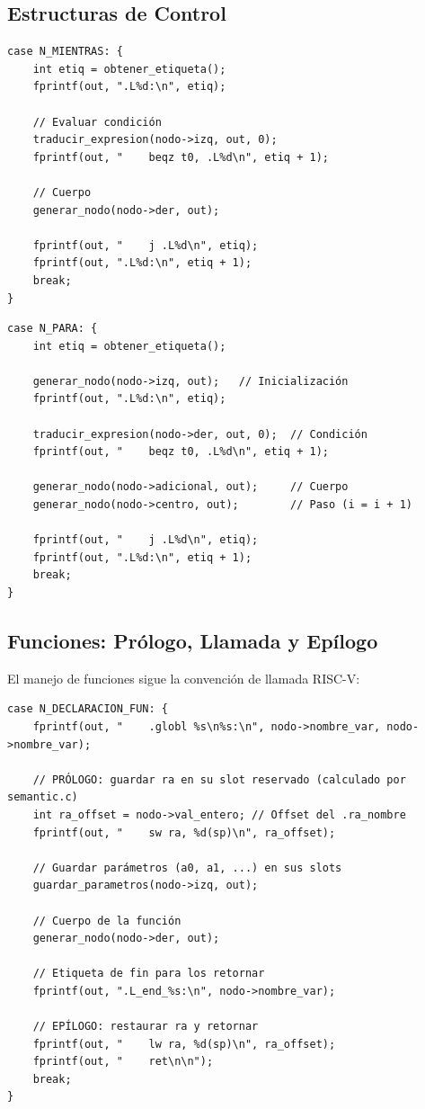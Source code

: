 \subsection{Estructuras de Control}

\begin{lstlisting}[style=cstyle, caption={Generación del bucle mientras}]
case N_MIENTRAS: {
    int etiq = obtener_etiqueta();
    fprintf(out, ".L%d:\n", etiq);
    
    // Evaluar condición
    traducir_expresion(nodo->izq, out, 0);
    fprintf(out, "    beqz t0, .L%d\n", etiq + 1);
    
    // Cuerpo
    generar_nodo(nodo->der, out);
    
    fprintf(out, "    j .L%d\n", etiq);
    fprintf(out, ".L%d:\n", etiq + 1);
    break;
}
\end{lstlisting}

\begin{lstlisting}[style=cstyle, caption={Generación del bucle para}]
case N_PARA: {
    int etiq = obtener_etiqueta();
    
    generar_nodo(nodo->izq, out);   // Inicialización
    fprintf(out, ".L%d:\n", etiq);
    
    traducir_expresion(nodo->der, out, 0);  // Condición
    fprintf(out, "    beqz t0, .L%d\n", etiq + 1);
    
    generar_nodo(nodo->adicional, out);     // Cuerpo
    generar_nodo(nodo->centro, out);        // Paso (i = i + 1)
    
    fprintf(out, "    j .L%d\n", etiq);
    fprintf(out, ".L%d:\n", etiq + 1);
    break;
}
\end{lstlisting}

\subsection{Funciones: Prólogo, Llamada y Epílogo}

El manejo de funciones sigue la convención de llamada RISC-V:

\begin{lstlisting}[style=cstyle, caption={Generación de declaración de función}]
case N_DECLARACION_FUN: {
    fprintf(out, "    .globl %s\n%s:\n", nodo->nombre_var, nodo->nombre_var);
    
    // PRÓLOGO: guardar ra en su slot reservado (calculado por semantic.c)
    int ra_offset = nodo->val_entero; // Offset del .ra_nombre
    fprintf(out, "    sw ra, %d(sp)\n", ra_offset);
    
    // Guardar parámetros (a0, a1, ...) en sus slots
    guardar_parametros(nodo->izq, out);
    
    // Cuerpo de la función
    generar_nodo(nodo->der, out);
    
    // Etiqueta de fin para los retornar
    fprintf(out, ".L_end_%s:\n", nodo->nombre_var);
    
    // EPÍLOGO: restaurar ra y retornar
    fprintf(out, "    lw ra, %d(sp)\n", ra_offset);
    fprintf(out, "    ret\n\n");
    break;
}
\end{lstlisting}

